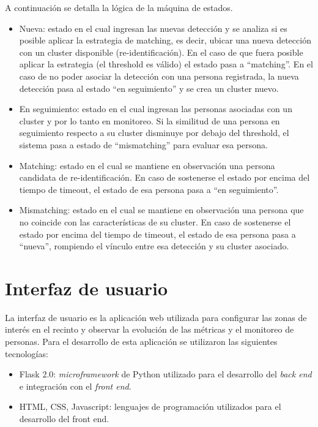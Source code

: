 A continuación se detalla la lógica de la máquina de estados.
\begin{itemize}
\item Nueva: estado en el cual ingresan las nuevas detección y se analiza si es posible aplicar la estrategia de matching, es decir, ubicar una nueva detección con un cluster disponible (re-identificación). En el caso de que fuera posible aplicar la estrategia (el threshold es válido) el estado pasa a ``matching''. En el caso de no poder asociar la detección con una persona registrada, la nueva detección pasa al estado ``en seguimiento'' y se crea un cluster nuevo.
\item En seguimiento: estado en el cual ingresan las personas asociadas con un cluster y por lo tanto en monitoreo. Si la similitud de una persona en seguimiento respecto a su cluster disminuye por debajo del threshold, el sistema pasa a estado de ``mismatching'' para evaluar esa persona.
\item Matching: estado en el cual se mantiene en observación una persona candidata de re-identificación. En caso de sostenerse el estado por encima del tiempo de timeout, el estado de esa persona pasa a ``en seguimiento''.
\item Mismatching: estado en el cual se mantiene en observación una persona que no coincide con las características de su cluster. En caso de sostenerse el estado por encima del tiempo de timeout, el estado de esa persona pasa a ``nueva'', rompiendo el vínculo entre esa detección y su cluster asociado.
\end{itemize}

\newpage


\section{Interfaz de usuario}
\label{sec:gui}

La interfaz de usuario es la aplicación web utilizada para configurar las zonas de interés en el recinto y observar la evolución de las métricas y el monitoreo de personas. Para el desarrollo de esta aplicación se utilizaron las siguientes tecnologías:
\begin{itemize}
\item Flask 2.0: \textit{microframework} \citep{FLASK} de Python utilizado para el desarrollo del \textit{back end} e integración con el \textit{front end}.
\item HTML, CSS, Javascript: lenguajes de programación utilizados para el desarrollo del front end.
\end{itemize}

